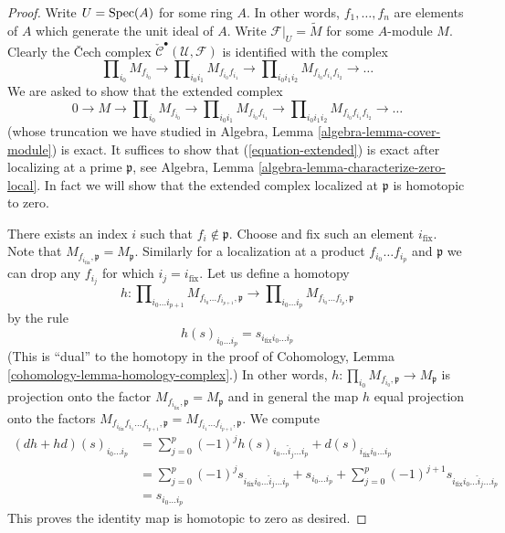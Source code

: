 \begin{proof}
Write $U = \mathop{\mathrm{Spec}}(A)$ for some ring $A$.
In other words, $f_1, \ldots, f_n$ are elements of $A$
which generate the unit ideal of $A$.
Write $\mathcal{F}|_U = \widetilde{M}$ for some $A$-module $M$.
Clearly the {\v C}ech complex
$\check{\mathcal{C}}^\bullet(\mathcal{U}, \mathcal{F})$
is identified with the complex
$$
\prod\nolimits_{i_0} M_{f_{i_0}} \to
\prod\nolimits_{i_0i_1} M_{f_{i_0}f_{i_1}} \to
\prod\nolimits_{i_0i_1i_2} M_{f_{i_0}f_{i_1}f_{i_2}} \to
\ldots
$$
We are asked to show that the extended complex
\begin{equation}
\label{equation-extended}
0 \to
M \to
\prod\nolimits_{i_0} M_{f_{i_0}} \to
\prod\nolimits_{i_0i_1} M_{f_{i_0}f_{i_1}} \to
\prod\nolimits_{i_0i_1i_2} M_{f_{i_0}f_{i_1}f_{i_2}} \to
\ldots
\end{equation}
(whose truncation we have studied in
Algebra, Lemma \ref{algebra-lemma-cover-module}) is exact.
It suffices to show that (\ref{equation-extended})
is exact after localizing at a prime $\mathfrak p$, see
Algebra, Lemma \ref{algebra-lemma-characterize-zero-local}.
In fact we will show that the extended complex localized
at $\mathfrak p$ is homotopic to zero.

\medskip\noindent
There exists an index $i$ such that $f_i \not \in \mathfrak p$.
Choose and fix such an element $i_{\text{fix}}$. Note that
$M_{f_{i_{\text{fix}}}, \mathfrak p} = M_{\mathfrak p}$. Similarly
for a localization at a product $f_{i_0} \ldots f_{i_p}$ and $\mathfrak p$
we can drop any $f_{i_j}$ for which $i_j = i_{\text{fix}}$.
Let us define a homotopy
$$
h :
\prod\nolimits_{i_0 \ldots i_{p + 1}}
M_{f_{i_0} \ldots f_{i_{p + 1}}, \mathfrak p}
\longrightarrow
\prod\nolimits_{i_0 \ldots i_p}
M_{f_{i_0} \ldots f_{i_p}, \mathfrak p}
$$
by the rule
$$
h(s)_{i_0 \ldots i_p} = s_{i_{\text{fix}} i_0 \ldots i_p}
$$
(This is ``dual'' to the homotopy in the proof of
Cohomology, Lemma \ref{cohomology-lemma-homology-complex}.)
In other words, $h : \prod_{i_0} M_{f_{i_0}, \mathfrak p} \to M_\mathfrak p$
is projection onto the factor
$M_{f_{i_{\text{fix}}}, \mathfrak p} = M_{\mathfrak p}$ and in general
the map $h$ equal projection onto the factors
$M_{f_{i_{\text{fix}}} f_{i_1} \ldots f_{i_{p + 1}}, \mathfrak p}
= M_{f_{i_1} \ldots f_{i_{p + 1}}, \mathfrak p}$. We compute
\begin{align*}
(dh + hd)(s)_{i_0 \ldots i_p}
& =
\sum\nolimits_{j = 0}^p
(-1)^j
h(s)_{i_0 \ldots \hat i_j \ldots i_p}
+
d(s)_{i_{\text{fix}} i_0 \ldots i_p}\\
& =
\sum\nolimits_{j = 0}^p
(-1)^j
s_{i_{\text{fix}} i_0 \ldots \hat i_j \ldots i_p}
+
s_{i_0 \ldots i_p}
+
\sum\nolimits_{j = 0}^p
(-1)^{j + 1}
s_{i_{\text{fix}} i_0 \ldots \hat i_j \ldots i_p} \\
& =
s_{i_0 \ldots i_p}
\end{align*}
This proves the identity map is homotopic to zero as desired.
\end{proof}

